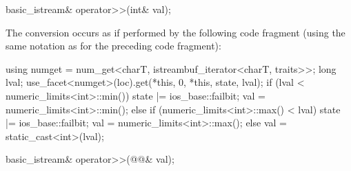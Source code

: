 %
\begin{itemdecl}
basic_istream& operator>>(int& val);
\end{itemdecl}

\begin{itemdescr}
\pnum
The conversion occurs as if performed by the following code fragment
(using the same notation as for the preceding code fragment):
\begin{codeblock}
using numget = num_get<charT, istreambuf_iterator<charT, traits>>;
long lval;
use_facet<numget>(loc).get(*this, 0, *this, state, lval);
if (lval < numeric_limits<int>::min()) {
  state |= ios_base::failbit;
  val = numeric_limits<int>::min();
} else if (numeric_limits<int>::max() < lval) {
  state |= ios_base::failbit;
  val = numeric_limits<int>::max();
} else
  val = static_cast<int>(lval);
\end{codeblock}
\end{itemdescr}

\begin{itemdecl}
basic_istream& operator>>(@@& val);
\end{itemdecl}

